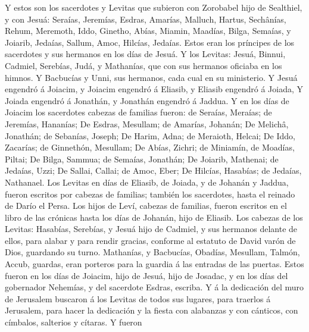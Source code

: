  Y estos son los sacerdotes y Levitas que subieron con
Zorobabel hijo de Sealthiel, y con Jesuá: Seraías, Jeremías, Esdras,
 Amarías, Malluch, Hartus,  Sechânías,
Rehum, Meremoth,  Iddo, Ginetho, Abías, 
Miamin, Maadías, Bilga,  Semaías, y Joiarib, Jedaías,
 Sallum, Amoc, Hilcías, Jedaías. Estos eran los príncipes
de los sacerdotes y sus hermanos en los días de Jesuá.  Y
los Levitas: Jesuá, Binnui, Cadmiel, Serebías, Judá, y Mathanías, que
con sus hermanos oficiaba en los himnos.  Y Bacbucías y
Unni, sus hermanos, cada cual en su ministerio.  Y Jesuá
engendró á Joiacim, y Joiacim engendró á Eliasib, y Eliasib engendró á
Joiada,  Y Joiada engendró á Jonathán, y Jonathán
engendró á Jaddua.  Y en los días de Joiacim los
sacerdotes cabezas de familias fueron: de Seraías, Meraías; de Jeremías,
Hananías;  De Esdras, Mesullam; de Amarías, Johanán;
 De Melichâ, Jonathán; de Sebanías, Joseph;
 De Harim, Adna; de Meraioth, Helcai;  De
Iddo, Zacarías; de Ginnethón, Mesullam;  De Abías,
Zichri; de Miniamín, de Moadías, Piltai;  De Bilga,
Sammua; de Semaías, Jonathán;  De Joiarib, Mathenai; de
Jedaías, Uzzi;  De Sallai, Callai; de Amoc, Eber;
 De Hilcías, Hasabías; de Jedaías, Nathanael.
 Los Levitas en días de Eliasib, de Joiada, y de Johanán
y Jaddua, fueron escritos por cabezas de familias; también los
sacerdotes, hasta el reinado de Darío el Persa.  Los
hijos de Leví, cabezas de familias, fueron escritos en el libro de las
crónicas hasta los días de Johanán, hijo de Eliasib.  Los
cabezas de los Levitas: Hasabías, Serebías, y Jesuá hijo de Cadmiel, y
sus hermanos delante de ellos, para alabar y para rendir gracias,
conforme al estatuto de David varón de Dios, guardando su turno.
 Mathanías, y Bacbucías, Obadías, Mesullam, Talmón,
Accub, guardas, eran porteros para la guardia á las entradas de las
puertas.  Estos fueron en los días de Joiacim, hijo de
Jesuá, hijo de Josadac, y en los días del gobernador Nehemías, y del
sacerdote Esdras, escriba.  Y á la dedicación del muro de
Jerusalem buscaron á los Levitas de todos sus lugares, para traerlos á
Jerusalem, para hacer la dedicación y la fiesta con alabanzas y con
cánticos, con címbalos, salterios y cítaras.  Y fueron
